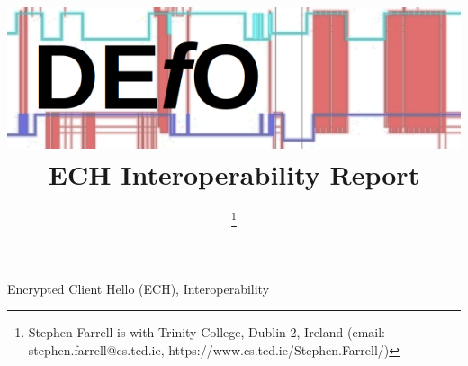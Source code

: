 \documentclass[12pt,draftclsnofoot,onecolumn]{IEEEtran}
\begin{document}

\title{
\includegraphics[width=\textwidth]{defologo.png}
ECH Interoperability Report}

\author{
\thanks{
Stephen Farrell is with Trinity College, Dublin 2, Ireland (email: stephen.farrell@cs.tcd.ie, https://www.cs.tcd.ie/Stephen.Farrell/)
}

}





\maketitle



\begin{IEEEkeywords}
Encrypted Client Hello (ECH), Interoperability
\end{IEEEkeywords}






\end{document}

